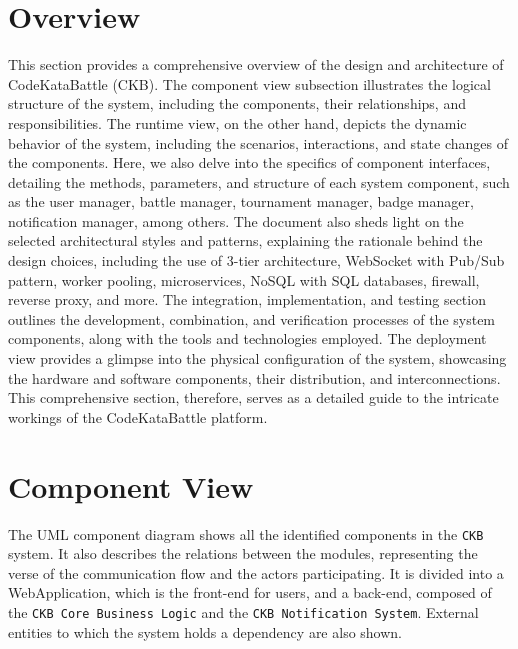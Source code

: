 \section{Overview}
This section provides a comprehensive overview of the design and architecture of CodeKataBattle (CKB). 
The component view subsection illustrates the logical structure of the system, including the components, their relationships, 
and responsibilities. The runtime view, on the other hand, depicts the dynamic behavior of the system, including the scenarios, 
interactions, and state changes of the components. 
Here, we also delve into the specifics of component interfaces, detailing the methods, parameters, and structure of each system component, 
such as the user manager, battle manager, tournament manager, badge manager, notification manager, among others. 
The document also sheds light on the selected architectural styles and patterns, explaining the rationale behind the design choices, 
including the use of 3-tier architecture, WebSocket with Pub/Sub pattern, worker pooling, microservices, NoSQL with SQL databases, 
firewall, reverse proxy, and more. The integration, implementation, and testing section outlines the development, combination, and 
verification processes of the system components, along with the tools and technologies employed. The deployment view provides a 
glimpse into the physical configuration of the system, showcasing the hardware and software components, their distribution, and interconnections. 
This comprehensive section, therefore, serves as a detailed guide to the intricate 
workings of the CodeKataBattle platform.

\newpage
\section{Component View}
\label{sec: component_view}%
The UML component diagram shows all the identified components in the \verb|CKB| system.
It also describes the relations between the modules, representing the verse of the communication flow and the actors participating.
It is divided into a WebApplication, which is the front-end for users, and a back-end, composed of the \verb|CKB Core Business Logic| and the \verb|CKB Notification System|.
External entities to which the system holds a dependency are also shown.

